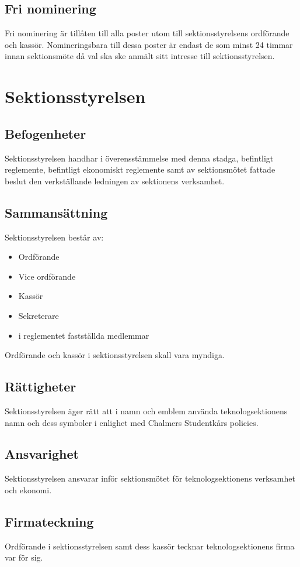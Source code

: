 \documentclass[a4paper, 10pt]{article}
\begin{document}
\subsection{Fri nominering}
Fri nominering är tillåten till alla poster utom till sektionsstyrelsens ordförande och kassör. Nomineringsbara till dessa poster är endast de som minst 24 timmar innan sektionsmöte då val ska ske anmält sitt intresse till sektionsstyrelsen.
\newpage

\section{Sektionsstyrelsen}
\subsection{Befogenheter}
Sektionsstyrelsen handhar i överensstämmelse med denna stadga, befintligt reglemente, befintligt ekonomiskt reglemente samt av sektionsmötet fattade beslut den verkställande ledningen av sektionens verksamhet.
\subsection{Sammansättning}
Sektionsstyrelsen består av:
\begin{itemize}
\item Ordförande
\item Vice ordförande
\item Kassör
\item Sekreterare
\item i reglementet fastställda medlemmar
\end{itemize}
Ordförande och kassör i sektionsstyrelsen skall vara myndiga.
\subsection{Rättigheter}
Sektionsstyrelsen äger rätt att i namn och emblem använda teknologsektionens namn och dess symboler i enlighet med Chalmers Studentkårs policies.
\subsection{Ansvarighet}
Sektionsstyrelsen ansvarar inför sektionsmötet för teknologsektionens verksamhet och ekonomi.
\subsection{Firmateckning}
Ordförande i sektionsstyrelsen samt dess kassör tecknar teknologsektionens firma var för sig.
\end{document}
